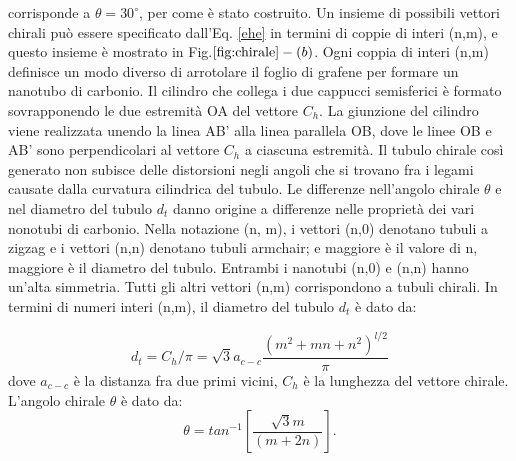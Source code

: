 \documentclass[a4paper,titlepage]{book}
\begin{document}
corrisponde a $\theta= 30^\circ$, per come è stato costruito. Un insieme di possibili vettori chirali può essere specificato dall'Eq. \ref{ehe}  in termini di coppie di interi (n,m), e questo insieme è mostrato in Fig.$\ref{fig:chirale}-(b)$. Ogni coppia di interi (n,m) definisce un modo diverso di arrotolare il foglio di grafene per formare un nanotubo di carbonio.
Il cilindro che collega i due cappucci semisferici è formato sovrapponendo le due estremità OA del vettore $C_h$. La giunzione del cilindro viene realizzata unendo la linea AB' alla linea parallela OB, dove le linee OB e AB' sono perpendicolari al vettore $C_h$ a ciascuna estremità. Il tubulo chirale così generato non subisce delle distorsioni negli angoli che si trovano fra i legami causate dalla curvatura cilindrica del tubulo. Le differenze nell'angolo chirale $\theta$ e nel diametro del tubulo $d_t$ danno origine a differenze nelle proprietà dei vari nonotubi di carbonio. Nella notazione (n, m), i vettori (n,0) denotano tubuli a zigzag e i vettori (n,n) denotano tubuli armchair; e maggiore è il valore di n, maggiore è il diametro del tubulo. Entrambi i nanotubi (n,0) e (n,n) hanno un'alta simmetria. Tutti gli altri vettori (n,m) corrispondono a tubuli chirali. 
In termini di numeri interi (n,m), il diametro del tubulo $d_t$ è dato da:

\begin{equation}
d_t = C_h/\pi = \sqrt{3}a_{c-c}\frac{(m^2 + mn + n^2)^{l/2}}{\pi}
\end{equation}
dove $a_{c-c}$ è la distanza fra due primi vicini, $C_h$ è la lunghezza del vettore chirale.
L'angolo chirale $\theta$ è dato da:
\begin{equation}
\theta = tan^{-1}[\frac{\sqrt{3}m}{(m + 2n)}].
\end{equation}
\end{document}
